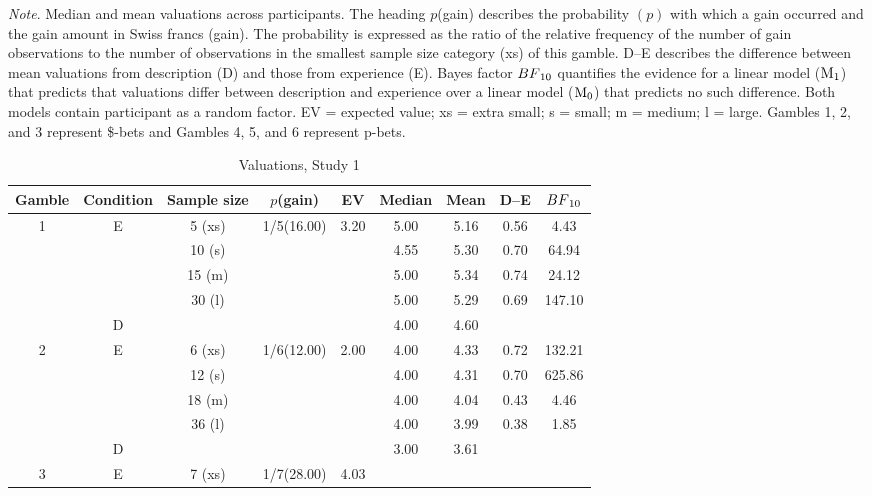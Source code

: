 \documentclass[a4paper, man, natbib, floatsintext]{apa6} %
\begin{document}
\begin{ThreePartTable}
\begin{TableNotes}
\small
\item \textit{Note}. Median and mean valuations across participants. The heading $p$(gain) describes the probability $(p)$ with which a gain occurred and the gain amount in Swiss francs (gain). The probability is expressed as the ratio of the relative frequency of the number of gain observations to the number of observations in the smallest sample size category (xs) of this gamble. D--E describes the difference between mean valuations from description (D) and those from experience (E). Bayes factor $BF\textsubscript{10}$ quantifies the evidence for a linear model ($\mathrm{M}\textsubscript{1}$) that predicts that valuations differ between description and experience over a linear model ($\mathrm{M}\textsubscript{0}$) that predicts no such difference. Both models contain participant as a random factor. EV = expected value; xs = extra small; s = small; m = medium; l = large. Gambles 1, 2, and 3 represent \$-bets and Gambles 4, 5, and 6 represent p-bets.
\end{TableNotes}
\footnotesize
\begin{longtable}{ccccccccc}
\caption{Valuations, Study 1}\label{table:meansStudy2}\\
\toprule
Gamble & Condition & Sample size & \(p\)(gain) & EV& Median & Mean& D--E & $BF\textsubscript{10}$\\
\midrule
\multirow{5}{*}{1} &\multirow{4}{*}{E} & 5 (xs)  & \multirow{5}{*}{1/5(16.00)}& \multirow{5}{*}{3.20}
 & 5.00 & 5.16 & 0.56 & 4.43\\
&& 10 (s) &&& 4.55 & 5.30& 0.70&64.94 \\
&& 15 (m)&&&5.00 & 5.34 & 0.74&24.12\\
&& 30 (l)&&& 5.00 & 5.29& 0.69&147.10\\
& D &&&&  4.00 & 4.60 && \\
\midrule
\multirow{5}{*}{2} &\multirow{4}{*}{E} & 6 (xs)  & \multirow{5}{*}{1/6(12.00)}&  \multirow{5}{*}{2.00}
& 4.00 & 4.33 & 0.72 &132.21\\
&& 12 (s) &&&   4.00 & 4.31 & 0.70&625.86 \\
&& 18 (m) &&&   4.00 & 4.04 & 0.43&4.46 \\
&& 36 (l) &&&   4.00 & 3.99 & 0.38 &1.85\\
& D &&&&   3.00 & 3.61 && \\
\midrule
\multirow{5}{*}{3} &\multirow{4}{*}{E} & 7 (xs)  & \multirow{5}{*}{1/7(28.00)}& \multirow{5}{*}{4.03}

\end{longtable}
\end{ThreePartTable}
\end{document}
